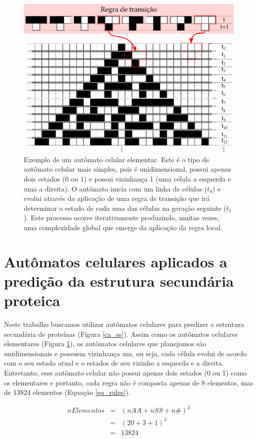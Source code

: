 \documentclass[]{scrreprt}
\begin{document}
\begin{figure}
	\label{ca}
	\includegraphics[width=1\linewidth]{ca_final}
	\caption{Exemplo de um autômato celular elementar. Este é o tipo de autômato celular mais simples, pois é unidimensional, possui apenas dois estados (0 ou 1) e possui vizinhança 1 (uma célula a esquerda e uma a direita). O autômato inicia com um linha de células ($t_{0}$) e evolui através da aplicação de uma regra de transição que irá determinar o estado de cada uma das células na geração seguinte ($t_{1}$). Este processo ocorre iterativamente produzindo, muitas vezes, uma complexidade global que emerge da aplicação da regra local.}
\end{figure}

\section{Autômatos celulares aplicados a predição da estrutura secundária proteica}

Neste trabalho buscamos utilizar autômatos celulares para predizer a estrutura secundária de proteínas (Figura \ref{ca_ss}). Assim como os autômatos celulares elementares (Figura \ref{ca}), os autômatos celulares que planejamos são unidimensionais e possuem vizinhança um, ou seja, cada célula evolui de acordo com o seu estado atual e o estados de seu vizinho a esquerda e a direita. Entretanto, esse autômato celular não possui apenas dois estados (0 ou 1) como os elementares e portanto, cada regra não é composta apenas de 8 elementos, mas de 13824 elementos (Equação \ref{eq_rules}).

\begin{eqnarray*}\label{eq_rules}
nElementos & = & (nAA + nSS + n\#)^3\\
		   & = & (20 + 3 + 1)^3\\
           & = & 13824
\end{eqnarray*}
\end{document}
